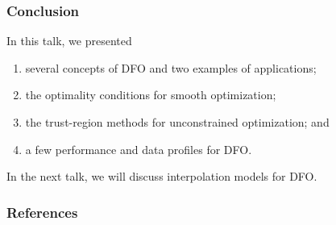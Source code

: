 \documentclass{polyu-presentation}
\begin{document}
\begin{frame}
    \frametitle{Conclusion}
    
    In this talk, we presented
    \begin{enumerate}
        \item several \alert{concepts of DFO} and two examples of \alert{applications};
        \item the \alert{optimality conditions} for smooth optimization;
        \item the \alert{trust-region methods} for unconstrained optimization; and
        \item a few \alert{performance and data profiles} for DFO.
    \end{enumerate}

    \bigskip

    In the next talk, we will discuss \alert{interpolation models for DFO}.
\end{frame}

\appendix

\begin{frame}[t,allowframebreaks]
    \frametitle{References}

	\printbibliography
\end{frame}
\end{document}
